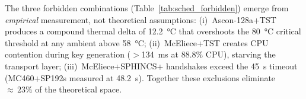 The three forbidden combinations (Table~\ref{tab:sched_forbidden})
emerge from \emph{empirical} measurement, not theoretical assumptions:
(i)~Ascon-128a+TST produces a compound thermal delta of
\SI{12.2}{\degreeCelsius} that overshoots the \SI{80}{\degreeCelsius}
critical threshold at any ambient above \SI{58}{\degreeCelsius};
(ii)~McEliece+TST creates CPU contention during key generation
($>$\SI{134}{\ms} at 88.8\% CPU), starving the transport layer;
(iii)~McEliece+SPHINCS+ handshakes exceed the
\SI{45}{\second} timeout (MC460+SP192s measured at
\SI{48.2}{\second}).  Together these exclusions eliminate
${\approx}\,23\%$ of the theoretical space.

